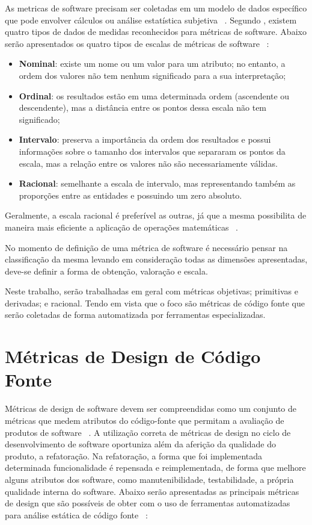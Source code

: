 As metricas de software precisam ser coletadas em um modelo de dados específico que pode envolver cálculos ou análise 
estatística subjetiva ~\cite{meirelles2013}. Segundo \cite{fenton&pfleenger98}, existem quatro tipos de dados de medidas
reconhecidos para métricas de software. Abaixo serão apresentados os quatro tipos de escalas de métricas de software 
~\cite{meirelles2013}:

\begin{itemize}
  \item \textbf{Nominal}: existe um nome ou um valor para um atributo; no entanto, a ordem dos valores não tem nenhum 
    significado para a sua interpretação;
  \item \textbf{Ordinal}: os resultados estão em uma determinada ordem (ascendente ou descendente), mas a distância entre os 
    pontos dessa escala não tem significado;
  \item \textbf{Intervalo}: preserva a importância da ordem dos resultados e possui informações sobre o tamanho dos intervalos
    que separaram os pontos da escala, mas a relação entre os valores não são necessariamente válidas.
  \item \textbf{Racional}: semelhante a escala de intervalo, mas representando também as proporções entre as entidades e
    possuindo um zero absoluto. 
\end{itemize}

Geralmente, a escala racional é preferível as outras, já que a mesma possibilita de maneira mais eficiente a aplicação de 
operações matemáticas ~\cite{meirelles2013}.

No momento de definição de uma métrica de software é necessário pensar na classificação da mesma levando em consideração
todas as dimensões apresentadas, deve-se definir a forma de obtenção, valoração e escala.

Neste trabalho, serão trabalhadas em geral com métricas objetivas; primitivas e derivadas; e racional. Tendo em vista que o 
foco são métricas de código fonte que serão coletadas de forma automatizada por ferramentas especializadas.

\section{Métricas de Design de Código Fonte}

Métricas de design de software devem ser compreendidas como um conjunto de métricas que medem atributos do código-fonte que 
permitam a avaliação de produtos de software ~\cite{arthur&carlos2014}. A utilização correta de métricas de design no ciclo
de desenvolvimento de software oportuniza além da aferição da qualidade do produto, a refatoração. Na refatoração, a forma que
foi implementada determinada funcionalidade é repensada e reimplementada, de forma que melhore alguns atributos dos software,
como manutenibilidade, testabilidade, a própria qualidade interna do software. Abaixo serão apresentadas as principais métricas
de design que são possíveis de obter com o uso de ferramentas automatizadas para análise estática de código fonte 
~\cite{arthur&carlos2014,meirelles2013}:


